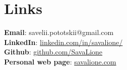 \documentclass[a4paper,11pt]{article}
\begin{document}

\section{Links}
\begin{itemize}[leftmargin=0.15in, label={}]
    \normalsize{\item{
                    \textbf{Email}{:  savelii.pototskii@gmail.com} \\
                    \textbf{LinkedIn}{:  \href{https://linkedin.com/in/savalione/}{linkedin.com/in/savalione/}} \\
                    \textbf{Github}{:  \href{https://github.com/SavaLione}{github.com/SavaLione}} \\
                    \textbf{Personal web page}{: \href{https://savalione.com}{savalione.com} } \\
              }}
\end{itemize}

\end{document}
